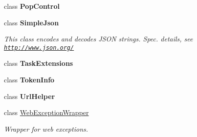 \begin{DoxyCompactItemize}
class {\bfseries Pop\+Control}
\item 
class {\bfseries Simple\+Json}
\begin{DoxyCompactList}\small\item\em This class encodes and decodes J\+S\+O\+N strings. Spec. details, see \href{http://www.json.org/}{\tt http\+://www.\+json.\+org/} \end{DoxyCompactList}\item 
class {\bfseries Task\+Extensions}
\item 
class {\bfseries Token\+Info}
\item 
class {\bfseries Url\+Helper}
\item 
class \hyperlink{class_accela_1_1_windows_store_s_d_k_1_1_web_exception_wrapper}{Web\+Exception\+Wrapper}
\begin{DoxyCompactList}\small\item\em Wrapper for web exceptions. \end{DoxyCompactList}\end{DoxyCompactItemize}
